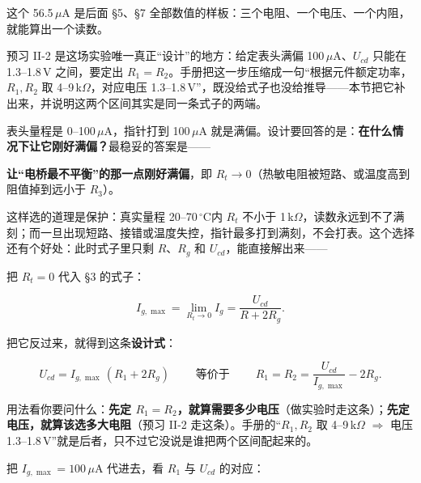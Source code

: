 \documentclass[11pt]{ctexart}
\newcommand{\degC}{\ensuremath{\,^\circ\mathrm{C}}}
\begin{document}
这个 56.5\,$\mu$A 是后面 §5、§7 全部数值的样板：三个电阻、一个电压、一个内阻，就能算出一个读数。



预习 II-2 是这场实验唯一真正“设计”的地方：给定表头满偏 100\,$\mu$A、$U_{cd}$ 只能在 1.3--1.8\,V 之间，要定出 $R_1=R_2$。手册把这一步压缩成一句“根据元件额定功率，$R_1,R_2$ 取 4--9\,k$\Omega$，对应电压 1.3--1.8\,V”，既没给式子也没给推导——本节把它补出来，并说明这两个区间其实是同一条式子的两端。


表头量程是 0--100\,$\mu$A，指针打到 100\,$\mu$A 就是满偏。设计要回答的是：\textbf{在什么情况下让它刚好满偏？}最稳妥的答案是——

\begin{center}
\textbf{让“电桥最不平衡”的那一点刚好满偏}，即 $R_t\to0$（热敏电阻被短路、或温度高到阻值掉到远小于 $R_3$）。
\end{center}

这样选的道理是保护：真实量程 20--70\degC 内 $R_t$ 不小于 1\,k$\Omega$，读数永远到不了满刻；而一旦出现短路、接错或温度失控，指针最多打到满刻，不会打表。这个选择还有个好处：此时式子里只剩 $R$、$R_g$ 和 $U_{cd}$，能直接解出来——

把 $R_t=0$ 代入 §3 的式子：

\[
I_{g,\max}=\lim_{R_t\to0}I_g=\frac{U_{cd}}{R+2R_g}.
\]


把它反过来，就得到这条\textbf{设计式}：

\[
\boxed{\;U_{cd}=I_{g,\max}\,(R_1+2R_g)\;}
\qquad\text{等价于}\qquad
\boxed{\;R_1=R_2=\frac{U_{cd}}{I_{g,\max}}-2R_g.\;}
\]

用法看你要问什么：\textbf{先定 $R_1=R_2$，就算需要多少电压}（做实验时走这条）；\textbf{先定电压，就算该选多大电阻}（预习 II-2 走这条）。手册的“$R_1,R_2$ 取 4--9\,k$\Omega$ $\Rightarrow$ 电压 1.3--1.8\,V”就是后者，只不过它没说是谁把两个区间配起来的。


把 $I_{g,\max}=100\,\mu$A 代进去，看 $R_1$ 与 $U_{cd}$ 的对应：
\end{document}

